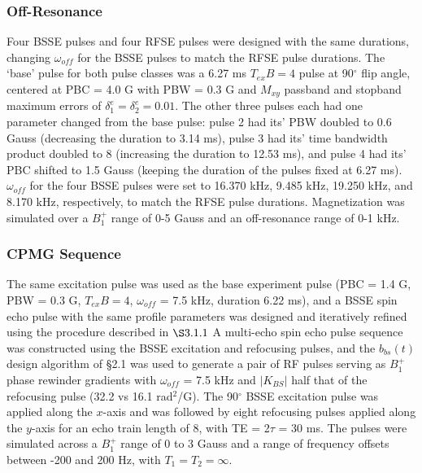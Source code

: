 \documentclass{article}
\newcommand{\bbst}{b_{bs}(t)}
\begin{document}
\subsubsection{Off-Resonance}
Four BSSE pulses and four RFSE pulses were designed with the same durations, 
changing $\omega_{off}$ for the BSSE pulses to match the RFSE pulse durations. 
The `base' pulse for both pulse classes was a 6.27 ms $T_{ex}B = 4$ pulse at 90$^\circ$ flip angle, 
centered at PBC = 4.0 G with PBW = 0.3 G and $M_{xy}$ passband and stopband maximum errors of 
$\delta_1^e = \delta_2^e = 0.01$.
The other three pulses each had one parameter changed from the base pulse: 
pulse 2 had its' PBW doubled to 0.6 Gauss (decreasing the duration to 3.14 ms), 
pulse 3 had its' time bandwidth product doubled to 8 (increasing the duration to 12.53 ms),
and pulse 4 had its' PBC shifted to 1.5 Gauss (keeping the duration of the pulses fixed at 6.27 ms). 
$\omega_{off}$ for the four BSSE pulses were set to 16.370 kHz, 9.485 kHz, 19.250 kHz, and 8.170 kHz, respectively,
to match the RFSE pulse durations. 
Magnetization was simulated over a $B_1^+$ range of 0-5 Gauss and an off-resonance range of 0-1 kHz.

\subsubsection{CPMG Sequence}
The same excitation pulse was used as the base experiment pulse (PBC = 1.4 G, PBW = 0.3 G, $T_{ex}B=4$, $\omega_{off}$ = 7.5 kHz, duration 6.22 ms), 
and a BSSE spin echo pulse with the same profile parameters was designed and iteratively refined using the procedure described in $\S 3.1.1$
A multi-echo spin echo pulse sequence was constructed using the BSSE excitation and refocusing pulses, 
and the $\bbst$ 
design algorithm of \S 2.1 was used to generate a pair of RF pulses serving as $B_1^+$ phase rewinder gradients with $\omega_{off}$ = 7.5 kHz and $|K_{BS}|$ half that of the refocusing pulse (32.2 vs 16.1 rad$^2$/G). 
The 90$^\circ$ BSSE excitation pulse was applied along the $x$-axis and was followed by eight refocusing pulses applied along the $y$-axis for an echo train length of 8, with TE = 2$\tau$ = 30 ms. 
The pulses were simulated across a $B_1^+$ range of 0 to 3 Gauss and
a range of frequency offsets between -200 and 200 Hz, 
with $T_1 = T_2 = \infty$. 
\end{document}
